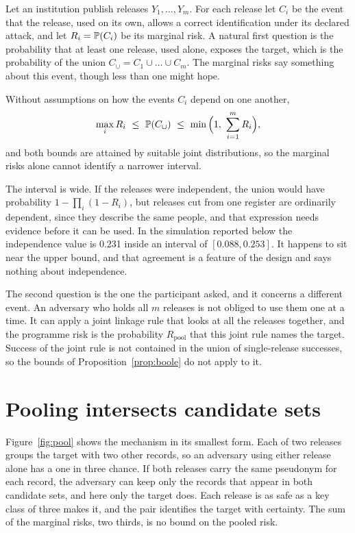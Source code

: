 Let an institution publish releases $Y_1,\dots,Y_m$. For each release let $C_i$ be
the event that the release, used on its own, allows a correct identification under
its declared attack, and let $R_i = \mathbb{P}(C_i)$ be its marginal risk. A natural
first question is the probability that at least one release, used alone, exposes
the target, which is the probability of the union
$C_\cup = C_1 \cup \dots \cup C_m$. The marginal risks say something about this
event, though less than one might hope.

\begin{proposition}\label{prop:boole}
Without assumptions on how the events $C_i$ depend on one another,
\begin{equation}\label{eq:boole}
\max_i R_i \ \le\ \mathbb{P}(C_\cup)\ \le\ \min\Big(1,\ \sum_{i=1}^m R_i\Big),
\end{equation}
and both bounds are attained by suitable joint distributions, so the marginal risks
alone cannot identify a narrower interval.
\end{proposition}

The interval is wide. If the releases were independent, the union would have
probability $1 - \prod_i (1 - R_i)$, but releases cut from one register are
ordinarily dependent, since they describe the same people, and that expression
needs evidence before it can be used. In the simulation reported below the
independence value is 0.231 inside an interval of $[0.088, 0.253]$. It happens to
sit near the upper bound, and that agreement is a feature of the design and says
nothing about independence.

The second question is the one the participant asked, and it concerns a different
event. An adversary who holds all $m$ releases is not obliged to use them one at a
time. It can apply a joint linkage rule that looks at all the releases together, and
the programme risk is the probability $R_{\mathrm{pool}}$ that this joint rule names
the target. Success of the joint rule is not contained in the union of single-release
successes, so the bounds of Proposition~\ref{prop:boole} do not apply to it.

\section{Pooling intersects candidate sets}

Figure~\ref{fig:pool} shows the mechanism in its smallest form. Each of two
releases groups the target with two other records, so an adversary using either
release alone has a one in three chance. If both releases carry the same pseudonym
for each record, the adversary can keep only the records that appear in both
candidate sets, and here only the target does. Each release is as safe as a key
class of three makes it, and the pair identifies the target with certainty. The sum
of the marginal risks, two thirds, is no bound on the pooled risk.

